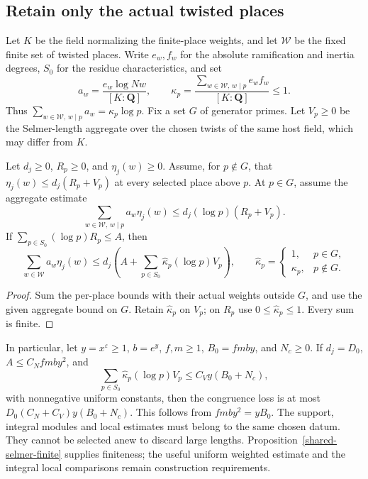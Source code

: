 \subsection{Retain only the actual twisted places}

Let \(K\) be the field normalizing the finite-place weights, and
let \(\mathcal W\) be the fixed finite set of twisted places.
Write \(e_w,f_w\) for the absolute ramification and inertia degrees,
\(S_0\) for the residue characteristics, and set
\[
 a_w=\frac{e_w\log Nw}{[K:\mathbf Q]},\qquad
 \kappa_p=\frac{\sum_{w\in\mathcal W,\,w\mid p}e_wf_w}
                  {[K:\mathbf Q]}\le1.
\]
Thus \(\sum_{w\in\mathcal W,\,w\mid p}a_w=\kappa_p\log p\).
Fix a set \(G\) of generator primes.  Let \(V_p\ge0\) be the
Selmer-length aggregate over the chosen twists of the same host
field, which may differ from \(K\).

\begin{proposition}\label{shared-twisted-selmer-budget}
Let \(d_j\ge0\), \(R_p\ge0\), and \(\eta_j(w)\ge0\).
Assume, for \(p\notin G\), that
\(\eta_j(w)\le d_j(R_p+V_p)\) at every selected place above \(p\).
At \(p\in G\), assume the aggregate estimate
\[
 \sum_{w\in\mathcal W,\,w\mid p}a_w\eta_j(w)
               \le d_j(\log p)(R_p+V_p).
\]
If \(\sum_{p\in S_0}(\log p)R_p\le A\), then
\[
 \sum_{w\in\mathcal W}a_w\eta_j(w)
 \le d_j\left(A+\sum_{p\in S_0}\widehat\kappa_p(\log p)V_p\right),
 \qquad
 \widehat\kappa_p=
 \begin{cases}1,&p\in G,\\ \kappa_p,&p\notin G.\end{cases}
\]
\end{proposition}
\begin{proof}
Sum the per-place bounds with their actual weights outside \(G\),
and use the given aggregate bound on \(G\).  Retain
\(\widehat\kappa_p\) on \(V_p\); on \(R_p\) use
\(0\le\widehat\kappa_p\le1\).  Every sum is finite.
\end{proof}

In particular, let \(y=x^\varepsilon\ge1\), \(b=e^y\),
\(f,m\ge1\), \(B_0=fmby\), and \(N_c\ge0\).
If \(d_j=D_0\), \(A\le C_Nfmby^2\), and
\[
 \sum_{p\in S_0}\widehat\kappa_p(\log p)V_p
                       \le C_Vy(B_0+N_c),
\]
with nonnegative uniform constants, then the congruence loss is at
most \(D_0(C_N+C_V)y(B_0+N_c)\).  This follows from
\(fmby^2=yB_0\).  The support, integral modules and local estimates
must belong to the same chosen datum.  They cannot be selected anew
to discard large lengths.  Proposition~\ref{shared-selmer-finite}
supplies finiteness; the useful uniform weighted estimate and the
integral local comparisons remain construction requirements.
